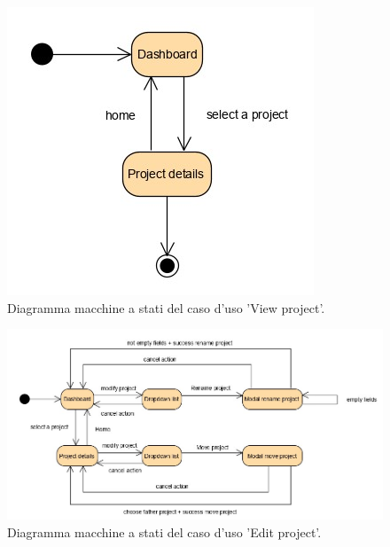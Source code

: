 \begin{figure}[H]
	\centering
	\caption{Diagramma macchine a stati del caso d'uso 'View project'.}
	\label{fig:diagramma-macchine-stati:view-project}
	\includegraphics[width=\textwidth]{images/diagramma-macchine-stati/view-project}
\end{figure}


\begin{figure}[H]
	\centering
	\caption{Diagramma macchine a stati del caso d'uso 'Edit project'.}
	\label{fig:diagramma-macchine-stati:edit-project}
	\includegraphics[width=\textwidth]{images/diagramma-macchine-stati/edit-project}
\end{figure}

